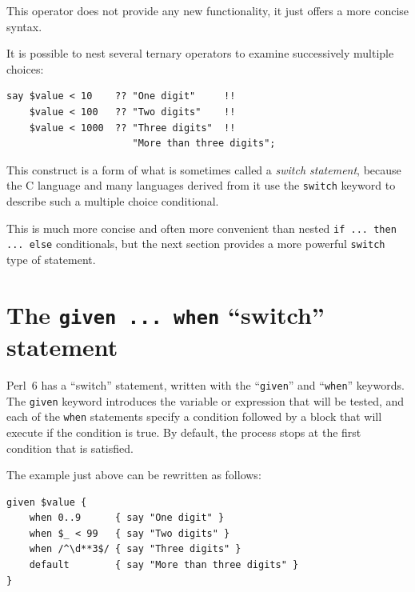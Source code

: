 This operator does not provide any new functionality, it just 
offers a more concise syntax.

It is possible to nest several ternary operators to examine 
successively multiple choices:

\begin{verbatim}
say $value < 10    ?? "One digit"     !! 
    $value < 100   ?? "Two digits"    !!
    $value < 1000  ?? "Three digits"  !!
                      "More than three digits";
\end{verbatim}

This construct is a form of what is sometimes called a 
\emph{switch statement}, because the C language and 
many languages derived from it use the {\tt switch} keyword 
to describe such a multiple choice conditional.

This is much more concise and often more convenient than nested 
{\tt if ... then ... else} conditionals, but the next section 
provides a more powerful {\tt switch} type of statement.

\section{The {\tt given ... when} ``switch'' statement}
\label{given_when}

Perl~6 has a ``switch'' statement, written with the 
``{\tt given}'' and ``{\tt when}'' keywords. The 
{\tt given} keyword introduces the variable or expression 
that will be tested, and each of the {\tt when} 
statements specify a condition followed by a block that 
will execute if the condition is true. By default, the 
process stops at the first condition that is satisfied.

The example just above can be rewritten as follows:

\begin{verbatim}
given $value {
    when 0..9      { say "One digit" }
    when $_ < 99   { say "Two digits" }
    when /^\d**3$/ { say "Three digits" }
    default        { say "More than three digits" }
}
\end{verbatim}

